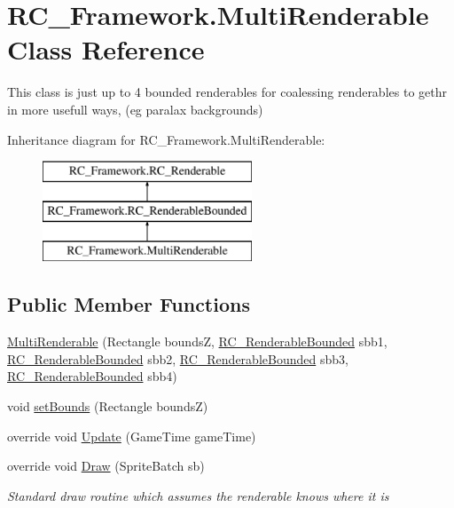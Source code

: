 \hypertarget{class_r_c___framework_1_1_multi_renderable}{}\section{R\+C\+\_\+\+Framework.\+Multi\+Renderable Class Reference}
\label{class_r_c___framework_1_1_multi_renderable}


This class is just up to 4 bounded renderables for coalessing renderables to gethr in more usefull ways, (eg paralax backgrounds)  


Inheritance diagram for R\+C\+\_\+\+Framework.\+Multi\+Renderable\+:\begin{figure}[H]
\begin{center}
\leavevmode
\includegraphics[height=3.000000cm]{class_r_c___framework_1_1_multi_renderable}
\end{center}
\end{figure}
\subsection*{Public Member Functions}
\begin{DoxyCompactItemize}
\item 
\mbox{\hyperlink{class_r_c___framework_1_1_multi_renderable_a86a299bbcb99c632f2b123a100fa9eef}{Multi\+Renderable}} (Rectangle boundsZ, \mbox{\hyperlink{class_r_c___framework_1_1_r_c___renderable_bounded}{R\+C\+\_\+\+Renderable\+Bounded}} sbb1, \mbox{\hyperlink{class_r_c___framework_1_1_r_c___renderable_bounded}{R\+C\+\_\+\+Renderable\+Bounded}} sbb2, \mbox{\hyperlink{class_r_c___framework_1_1_r_c___renderable_bounded}{R\+C\+\_\+\+Renderable\+Bounded}} sbb3, \mbox{\hyperlink{class_r_c___framework_1_1_r_c___renderable_bounded}{R\+C\+\_\+\+Renderable\+Bounded}} sbb4)
\item 
void \mbox{\hyperlink{class_r_c___framework_1_1_multi_renderable_a923ab24c09b28daaf29c65d14d23b3ff}{set\+Bounds}} (Rectangle boundsZ)
\item 
override void \mbox{\hyperlink{class_r_c___framework_1_1_multi_renderable_a3eabd07384410252141e9b10e52b1783}{Update}} (Game\+Time game\+Time)
\item 
override void \mbox{\hyperlink{class_r_c___framework_1_1_multi_renderable_ae81e6924e30c2ff36c5b13204f3d2857}{Draw}} (Sprite\+Batch sb)
\begin{DoxyCompactList}\small\item\em Standard draw routine which assumes the renderable knows where it is \end{DoxyCompactList}\end{DoxyCompactItemize}
